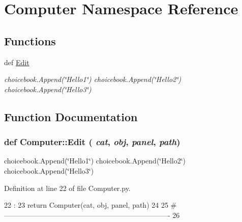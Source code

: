 \hypertarget{namespaceComputer}{
\section{Computer Namespace Reference}
\label{namespaceComputer}
}
\subsection*{Functions}
\begin{DoxyCompactItemize}
\item 
def \hyperlink{namespaceComputer_a5b17db31a35f6dfc40a68e2cab5ca8ee}{Edit}
\begin{DoxyCompactList}\small\item\em choicebook.Append(\char`\"{}Hello1\char`\"{}) choicebook.Append(\char`\"{}Hello2\char`\"{}) choicebook.Append(\char`\"{}Hello3\char`\"{}) \item\end{DoxyCompactList}\end{DoxyCompactItemize}


\subsection{Function Documentation}
\hypertarget{namespaceComputer_a5b17db31a35f6dfc40a68e2cab5ca8ee}{
\subsubsection[{Edit}]{\setlength{\rightskip}{0pt plus 5cm}def Computer::Edit ( {\em cat}, \/   {\em obj}, \/   {\em panel}, \/   {\em path})}}
\label{namespaceComputer_a5b17db31a35f6dfc40a68e2cab5ca8ee}


choicebook.Append(\char`\"{}Hello1\char`\"{}) choicebook.Append(\char`\"{}Hello2\char`\"{}) choicebook.Append(\char`\"{}Hello3\char`\"{}) 

Definition at line 22 of file Computer.py.


\begin{DoxyCode}
22                                 :
23     return Computer(cat, obj, panel, path)
24 
25 #----------------------------------------------------------------------
26 

\end{DoxyCode}

